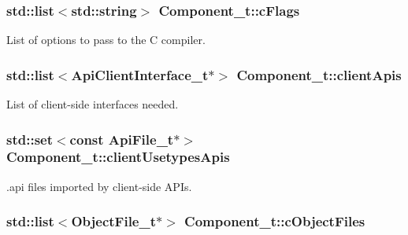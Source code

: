 \subsubsection[{\texorpdfstring{c\+Flags}{cFlags}}]{\setlength{\rightskip}{0pt plus 5cm}std\+::list$<$std\+::string$>$ Component\+\_\+t\+::c\+Flags}\hypertarget{struct_component__t_a4b8e64eb72dfe75efdd8c1f5547eff53}{}\label{struct_component__t_a4b8e64eb72dfe75efdd8c1f5547eff53}


List of options to pass to the C compiler. 

\subsubsection[{\texorpdfstring{client\+Apis}{clientApis}}]{\setlength{\rightskip}{0pt plus 5cm}std\+::list$<${\bf Api\+Client\+Interface\+\_\+t}$\ast$$>$ Component\+\_\+t\+::client\+Apis}\hypertarget{struct_component__t_a2d294d8fd320f9a9931cbbebbaafcd99}{}\label{struct_component__t_a2d294d8fd320f9a9931cbbebbaafcd99}


List of client-\/side interfaces needed. 

\subsubsection[{\texorpdfstring{client\+Usetypes\+Apis}{clientUsetypesApis}}]{\setlength{\rightskip}{0pt plus 5cm}std\+::set$<$const {\bf Api\+File\+\_\+t}$\ast$$>$ Component\+\_\+t\+::client\+Usetypes\+Apis}\hypertarget{struct_component__t_aa2c706846b2e8e2ede22fa5431d48191}{}\label{struct_component__t_aa2c706846b2e8e2ede22fa5431d48191}


.api files imported by client-\/side A\+P\+Is. 

\subsubsection[{\texorpdfstring{c\+Object\+Files}{cObjectFiles}}]{\setlength{\rightskip}{0pt plus 5cm}std\+::list$<${\bf Object\+File\+\_\+t}$\ast$$>$ Component\+\_\+t\+::c\+Object\+Files}\hypertarget{struct_component__t_add01ad639e5c905574c8c5b5ffc09c89}{}\label{struct_component__t_add01ad639e5c905574c8c5b5ffc09c89}



